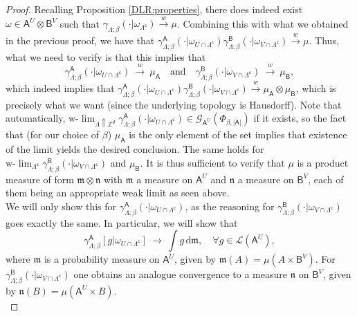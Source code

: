 \documentclass[12pt]{article}
\renewcommand{\AA}{\mathsf{A}}
\newcommand{\AB}{\mathsf{B}}
\renewcommand{\d}{\mathrm{d}}
\newcommand{\G}{\mathcal{G}}
\newcommand{\Loc}{\mathcal{L}}
\newcommand{\Z}{\mathbb{Z}}
\newcommand{\ra}{\rightarrow}
\newcommand{\pika}{\boldsymbol{\cdot}}
\newcommand{\1}{\mathbbm{1}}
\renewcommand{\c}{\mathsf{c}}
\newcommand{\5}{\vspace{0.5cm}}
\theoremstyle{definition}
\begin{document}
\begin{proof} Recalling Proposition \ref{DLR:properties}, there does indeed exist $\omega\in\AA^U\otimes\AB^V$ such that $\gamma_{\Lambda;\beta}(\pika|\omega_{\Lambda^\c})\xrightarrow{w}\mu$. Combining this with what we obtained in the previous proof, we have that $\gamma_{\Lambda;\beta}^\AA(\pika|\omega_{U\cap\Lambda^\c})\gamma_{\Lambda;\beta}^\AB(\pika|\omega_{V\cap\Lambda^\c})\xrightarrow{w}\mu$. Thus, what we need to verify is that this implies that
$$\gamma_{\Lambda;\beta}^\AA(\pika|\omega_{U\cap\Lambda^\c})~\xrightarrow{w}~\mu_\AA \quad\text{and}\quad\gamma_{\Lambda;\beta}^\AB(\pika|\omega_{V\cap\Lambda^\c})~\xrightarrow{w}~\mu_\AB,$$
which indeed implies that $\gamma_{\Lambda;\beta}^\AA(\pika|\omega_{U\cap\Lambda^\c})\gamma_{\Lambda;\beta}^\AB(\pika|\omega_{V\cap\Lambda^\c})\xrightarrow{w}\mu_{\AA}\otimes\mu_{\AB}$, which is precisely what we want (since the underlying topology is Hausdorff). Note that automatically, $\text{w-}\!\lim_{\Lambda\Uparrow\Z^d}\gamma_{\Lambda;\beta}^\AA(\pika|\omega_{U\cap\Lambda^\c})\in\G_{\AA^U}(\Phi_{\beta,|\AA|})$ if it exists, so the fact that (for our choice of $\beta$) $\mu_\AA$ is the only element of the set implies that existence of the limit yields the desired conclusion. The same holds for $\text{w-}\!\lim_{\Lambda^\c}\gamma_{\Lambda;\beta}^\AB(\pika|\omega_{V\cap\Lambda^\c})$ and $\mu_\AB$. It is thus sufficient to verify that $\mu$ is a product measure of form $\mathfrak{m}\otimes\mathfrak{n}$ with $\mathfrak{m}$ a measure on $\AA^U$ and $\mathfrak{n}$ a measure on $\AB^V$, each of them being an appropriate weak limit as seen above. \\

We will only show this for $\gamma_{\Lambda;\beta}^\AA(\pika|\omega_{U\cap\Lambda^\c})$, as the reasoning for $\gamma_{\Lambda;\beta}^\AB(\pika|\omega_{V\cap\Lambda^\c})$ goes exactly the same. In particular, we will show that
$$\gamma_{\Lambda;\beta}^\AA[g|\omega_{U\cap\Lambda^\c}] ~\ra~ \int g\,\d\mathfrak{m}, \quad \forall g\in\Loc(\AA^U),$$
where $\mathfrak{m}$ is a probability measure on $\AA^U$, given by $\mathfrak{m}(A)=\mu(A\times\AB^V)$. For $\gamma_{\Lambda;\beta}^\AB(\pika|\omega_{V\cap\Lambda^\c})$ one obtains an analogue convergence to a measure $\mathfrak{n}$ on $\AB^V$, given by $\mathfrak{n}(B)=\mu(\AA^U\times B)$. \\


\end{proof}
\end{document}
